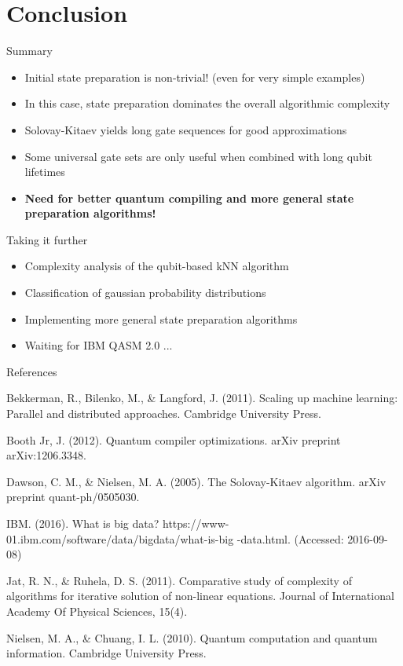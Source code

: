 \documentclass[10pt]{beamer}
\begin{document}
\section{Conclusion}

\begin{frame}{Summary}
\begin{itemize}
\item Initial state preparation is non-trivial! (even for very simple examples)
\item In this case, state preparation dominates the overall algorithmic complexity
\item Solovay-Kitaev yields long gate sequences for good approximations
\item Some universal gate sets are only useful when combined with long qubit lifetimes
\item \textbf{Need for better quantum compiling and more general state preparation algorithms!}
\end{itemize}
\end{frame}

\begin{frame}{Taking it further}

\begin{itemize}
\item Complexity analysis of the qubit-based kNN algorithm
\item Classification of gaussian probability distributions
\item Implementing more general state preparation algorithms
\item Waiting for IBM QASM 2.0 ...
\end{itemize}
\end{frame}

\begin{frame}{References}

\footnotesize{Bekkerman, R., Bilenko, M., \& Langford, J. (2011). Scaling up machine learning: Parallel and distributed
approaches. Cambridge University Press.\newline

Booth Jr, J. (2012). Quantum compiler optimizations. arXiv preprint arXiv:1206.3348.

Dawson, C. M., \& Nielsen, M. A. (2005). The Solovay-Kitaev algorithm. arXiv preprint quant-ph/0505030.\newline

IBM. (2016). What is big data? https://www-01.ibm.com/software/data/bigdata/what-is-big
-data.html. (Accessed: 2016-09-08) \newline

Jat, R. N., \& Ruhela, D. S. (2011). Comparative study of complexity of algorithms for iterative solution of non-linear equations. Journal of International Academy Of Physical Sciences, 15(4).\newline

Nielsen, M. A., \& Chuang, I. L. (2010). Quantum computation and quantum information. Cambridge University Press.}
\end{frame}
\end{document}
